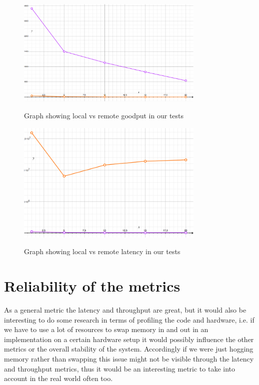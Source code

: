 \begin{figure}[h!]
    \centering
    \includegraphics[width=0.8\textwidth]{graf1.jpg}
    \label{fig:throughput}
    \caption{Graph showing local vs remote goodput in our tests}
\end{figure}

\begin{figure}[h!]
    \centering
    \includegraphics[width=0.8\textwidth]{graf2.jpg}
    \label{fig:latency}
    \caption{Graph showing local vs remote latency in our tests}
\end{figure}



\section{Reliability of the metrics}
As a general metric the latency and throughput are great, but it would also be interesting to do some research in terms of profiling the code and hardware, i.e. if we have to use a lot of resources to swap memory in and out in an implementation on a certain hardware setup it would possibly influence the other metrics or the overall stability of the system. Accordingly if we were just hogging memory rather than swapping this issue might not be visible through the latency and throughput metrics, thus it would be an interesting metric to take into account in the real world often too.

